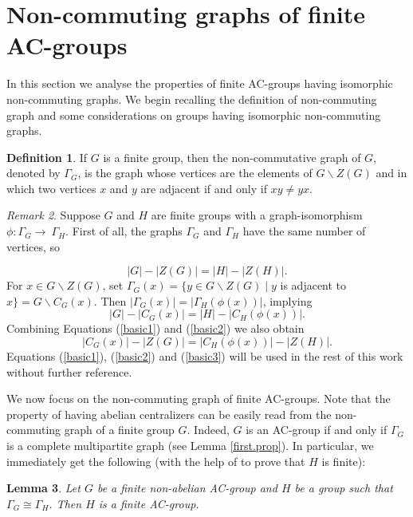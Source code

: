 \documentclass[12pt]{amsart}
\theoremstyle{definition}
\newtheorem{definition}{Definition}[section]
\theoremstyle{remark}
\newtheorem{remark}[definition]{Remark}
\theoremstyle{plain}
\theoremstyle{plain}
\theoremstyle{plain}
\theoremstyle{plain}
\newtheorem{lemma}[definition]{Lemma}
\theoremstyle{plain}
\theoremstyle{remark}
\theoremstyle{remark}
\theoremstyle{definition}
\begin{document}
\section{Non-commuting graphs of finite AC-groups}
In this section we analyse the properties of finite AC-groups having isomorphic non-commuting graphs.
We begin recalling the definition of non-commuting graph and some considerations on groups having isomorphic non-commuting graphs. 

\begin{definition}
If $G$ is a finite group, then the non-commutative graph of $G$, denoted by $\Gamma_G$, is the graph whose vertices are the elements of $G \backslash Z(G)$ and in which two vertices $x$ and $y$ are adjacent if and only if $xy \neq yx$.
\end{definition}


\begin{remark}
Suppose $G$ and $H$ are finite groups with a  graph-isomorphism $\phi \colon \Gamma_G \rightarrow~\Gamma_H$. First of all, the graphs  $\Gamma_G$ and $ \Gamma_H$ have the same number of vertices, so 

\begin{equation}\label{basic1} |G|-|Z(G)| = |H| - |Z(H)|. \end{equation}
For $x\in G \backslash Z(G)$, set $\Gamma_G(x) = \{y \in G \backslash Z(G) \mid y$ is adjacent to $x\} =G\backslash C_G(x)$. Then  $|\Gamma_G(x)| = |\Gamma_H(\phi(x))|$, implying
\begin{equation}\label{basic2}  |G|-|C_G(x)| = |H| - |C_H(\phi(x))|. \end{equation}
Combining Equations (\ref{basic1}) and (\ref{basic2}) we also obtain
\begin{equation}\label{basic3} |C_G(x)|-|Z(G)| = |C_H(\phi(x))| - |Z(H)|. \end{equation}
Equations (\ref{basic1}), (\ref{basic2}) and  (\ref{basic3}) will be used in the rest of this work without further reference.
\end{remark}


We now focus on the non-commuting graph of finite AC-groups. Note that the property of having abelian centralizers  can be easily read from the non-commuting graph of a finite group $G$. Indeed, $G$ is an AC-group if and only if $\Gamma_G$ is a complete multipartite graph (see Lemma \ref{first.prop}).
In particular, we immediately get the following (with the help of \cite[Lemma 3.1]{AAM} to prove that $H$ is finite):

\begin{lemma}\label{H.AC-group}
Let $G$ be a finite non-abelian AC-group and $H$ be a group such that $\Gamma_G \cong \Gamma_H$. Then $H$ is a finite AC-group. 
\end{lemma}
\end{document}
